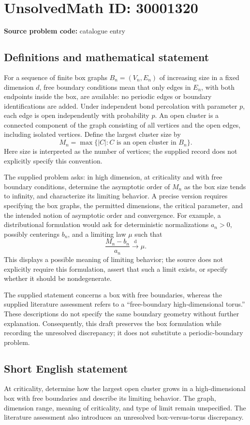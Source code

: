 \documentclass[11pt]{article}
\begin{document}
\section*{UnsolvedMath ID: 30001320}
\textbf{Source problem code:} catalogue entry
\subsection{Definitions and mathematical statement}
For a sequence of finite box graphs \(B_n=(V_n,E_n)\) of increasing size in a fixed dimension \(d\), free boundary conditions mean that only edges in \(E_n\), with both endpoints inside the box, are available: no periodic edges or boundary identifications are added. Under independent bond percolation with parameter \(p\), each edge is open independently with probability \(p\). An open cluster is a connected component of the graph consisting of all vertices and the open edges, including isolated vertices. Define the largest cluster size by
\[
M_n=\max\bigl\{|C|:C\text{ is an open cluster in }B_n\bigr\}.
\]
Here size is interpreted as the number of vertices; the supplied record does not explicitly specify this convention.

The supplied problem asks: in high dimension, at criticality and with free boundary conditions, determine the asymptotic order of \(M_n\) as the box size tends to infinity, and characterize its limiting behavior. A precise version requires specifying the box graphs, the permitted dimensions, the critical parameter, and the intended notion of asymptotic order and convergence. For example, a distributional formulation would ask for deterministic normalizations \(a_n>0\), possibly centerings \(b_n\), and a limiting law \(\mu\) such that
\[
\frac{M_n-b_n}{a_n}\xrightarrow{\mathrm d}\mu.
\]
This displays a possible meaning of limiting behavior; the source does not explicitly require this formulation, assert that such a limit exists, or specify whether it should be nondegenerate.

The supplied statement concerns a box with free boundaries, whereas the supplied literature assessment refers to a ``free-boundary high-dimensional torus.'' These descriptions do not specify the same boundary geometry without further explanation. Consequently, this draft preserves the box formulation while recording the unresolved discrepancy; it does not substitute a periodic-boundary problem.
\subsection{Short English statement}
At criticality, determine how the largest open cluster grows in a high-dimensional box with free boundaries and describe its limiting behavior. The graph, dimension range, meaning of criticality, and type of limit remain unspecified. The literature assessment also introduces an unresolved box-versus-torus discrepancy.
\end{document}
